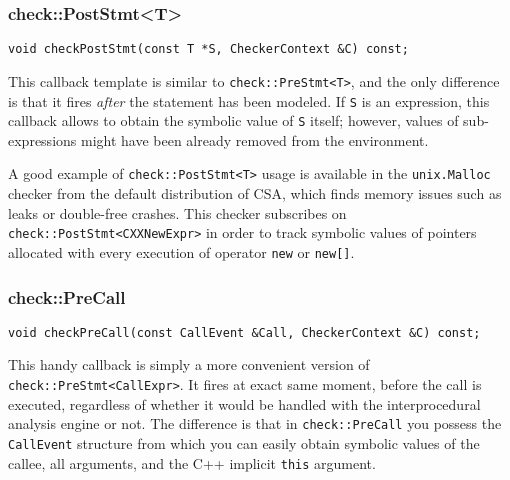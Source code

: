 \documentclass[a4paper,12pt]{article}
\newenvironment{nobr}{\begin{minipage}{\textwidth}\setlength\parskip{1em}
}{\end{minipage}\ignorespacesafterend}
\begin{document}
\begin{nobr}
\subsubsection{check::PostStmt<T>}

\begin{lstlisting}[style=cplusplus,numbers=none]
void checkPostStmt(const T *S, CheckerContext &C) const;
\end{lstlisting}

This callback template is similar to \lstinline|check::PreStmt<T>|, and the only difference is that it fires \emph{after} the statement has been modeled. If \lstinline|S| is an expression, this callback allows to obtain the symbolic value of \lstinline|S| itself; however, values of sub-expressions might have been already removed from the environment.
\end{nobr}

A good example of \lstinline|check::PostStmt<T>| usage is available in the \lstinline|unix.Malloc| checker from the default distribution of CSA, which finds memory issues such as leaks or double-free crashes. This checker subscribes on \lstinline|check::PostStmt<CXXNewExpr>| in order to track symbolic values of pointers allocated with every execution of operator \lstinline|new| or \lstinline|new[]|.

\begin{nobr}
\subsubsection{check::PreCall}

\begin{lstlisting}[style=cplusplus,numbers=none]
void checkPreCall(const CallEvent &Call, CheckerContext &C) const;
\end{lstlisting}

This handy callback is simply a more convenient version of \lstinline|check::PreStmt<CallExpr>|. It fires at exact same moment, before the call is executed, regardless of whether it would be handled with the interprocedural analysis engine or not. The difference is that in \lstinline|check::PreCall| you possess the \lstinline|CallEvent| structure from which you can easily obtain symbolic values of the callee, all arguments, and the C++ implicit \lstinline|this| argument.
\end{nobr}
\end{document}
